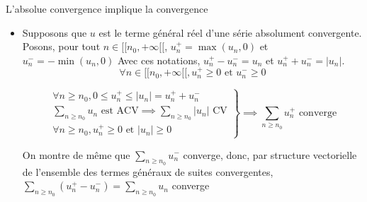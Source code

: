 \documentclass{article}
\renewenvironment{question_kholle}[2][ ]
{
	\subsection{\texorpdfstring{#2}{}}
	\notblank{#1}
	{
		\noindent #1
		\bigbreak
	}
	{}
	\begin{proof}
}
{
	\end{proof}
}
\begin{document}
\begin{question_kholle}[{Soit $u \in \K^{[ \! [ n_{0}, +\infty [ \![}$
	Si la série $\sum_{n\geqslant n_{0}}u_{n}$ est absolument convergente, alors la série $\sum_{n\geqslant n_{0}}u_{n}$ est convergente.}]{L'absolue convergence implique la convergence}



	\begin{itemize}[label=$\lozenge$]
		\item Supposons que $u$ est le terme général réel d'une série absolument convergente.
		      Posons, pour tout $n \in [ \! [ n_{0}, +\infty [ \![$, $u_{n}^{+}= \max(u_{n}, 0)$ et $u_{n}^{-}=- \min (u_{n}, 0)$
		      Avec ces notations, $u_{n}^{+}- u_{n}^{-} = u_{n}$ et $u_{n}^{+}+u_{n}^{-} = \lvert u_{n} \rvert$.
		      $$
			      \forall n \in [ \! [ n_{0}, +\infty [ \![, u_{n}^{+}\geqslant 0 \text{ et } u_{n}^{-}\geqslant 0
		      $$

		      $$
			      \left. \begin{array}{ll}
				      \forall n \geqslant n_{0}, 0\leqslant u_{n}^{+} \leqslant \lvert u_{n} \rvert = u_{n}^{+}+ u_{n}^{-}           \\
				      \sum_{n\geqslant n_{0}} u_{n} \text{ est ACV} \implies \sum_{n\geqslant n_{0}} \lvert u_{n} \rvert  \text{ CV} \\
				      \forall n \geqslant n_{0}, u_{n}^{+}\geqslant 0 \text{ et } \lvert u_{n} \rvert \geqslant 0
			      \end{array}\right\}\implies \sum_{n\geqslant n_{0}}u_{n} ^{+}\text{ converge}
		      $$

		      On montre de même que $\sum_{n\geqslant n_{0}}u_{n}^{-}$ converge, donc, par structure vectorielle de l'ensemble des termes généraux de suites convergentes, $\sum_{ n\geqslant n_{0}}(u_{n}^{+} - u_{n}^{-})= \sum_{n\geqslant n_{0}}u_{n}$ converge
		      \begin{figure}[H]
			      \centering
\end{figure}
\end{itemize}
\end{question_kholle}
\end{document}
